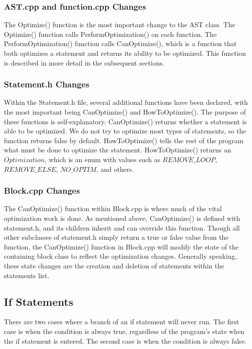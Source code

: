 \documentclass[sigconf]{acmart}
\begin{document}
\subsubsection{AST.cpp and function.cpp Changes}
The Optimize() function is the most important change to the AST class. The Optimize() function 
calls PerformOptimization() on each function. The PerformOptimization() function calls CanOptimize(), which is a function 
that both optimizes a statement and returns its ability to be optimized. This function is described in more detail in the 
subsequent sections.

\subsubsection{Statement.h Changes}
Within the Statement.h file, several additional functions have been declared, with the most important being 
CanOptimize() and HowToOptimize(). The purpose of these functions is self-explanatory. CanOptimize()
returns whether a statement is able to be optimized. We do not try to optimize most types of statements,
so the function returns false by default. HowToOptimize() tells the rest of the program what must be done to optimize 
the statement. HowToOptimize() returns an $Optimization$, which is an enum with values such as $REMOVE\_LOOP$, $REMOVE\_ELSE$, $NO\_OPTIM$,
and others. 

\subsubsection{Block.cpp Changes}
The CanOptimize() function within Block.cpp is where much of the vital optimization work is done.
As mentioned above, CanOptimize() is defined with statement.h, and its children inherit and can override this function.
Though all other subclasses of statement.h simply return a true or false value from the function, the CanOptimize() function 
in Block.cpp will modify the state of the containing block class to reflect the optimization changes. Generally speaking, 
these state changes are the creation and deletion of statements within the statements list.

\subsection{If Statements}
There are two cases where a branch of an if statement will never run. The first case is when the condition 
is always true, regardless of the program's state when the if statement is entered. The second case is when 
the condition is always false.
\end{document}
